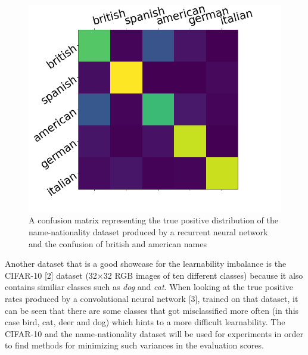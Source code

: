 \documentclass[journal]{IEEEtran}
\begin{document}
\begin{figure}[h!]
        \includegraphics[width=\linewidth]{images/Figure_1.png}
        \caption{A confusion matrix representing the true positive distribution of the name-nationality dataset produced by a recurrent neural network and the confusion of british and american names}
        \label{fig:tp_scores}
\end{figure}

Another dataset that is a good showcase for the learnability imbalance is the CIFAR-10 [2] dataset (32$\times$32 RGB images of ten different classes) because it also contains similiar classes such as \emph{dog} and \emph{cat}.
When looking at the true positive rates produced by a convolutional neural network [3], trained on that dataset, it can be seen that there are some classes that got misclassified more often (in this case bird, cat, deer and dog) which hints to a more difficult learnability. 
The CIFAR-10 and the name-nationality dataset will be used for experiments in order to find methods for minimizing such variances in the evaluation scores.

\end{document}
